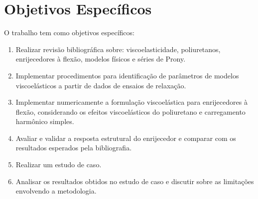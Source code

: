 \documentclass[arial,centeredequations,english,brazilian,oneside,section=TITLE]{ifes8}
\begin{document}
\section{Objetivos Específicos}
\label{sec:objetivos-especificos}

O trabalho tem como objetivos específicos:

\begin{enumerate}
  \item Realizar revisão bibliográfica sobre: viscoelasticidade, poliuretanos, 
enrijecedores à flexão, modelos físicos e séries de Prony.
  \item Implementar procedimentos para identificação de parâmetros de modelos 
viscoelásticos a partir de dados de ensaios de relaxação.
  \item Implementar numericamente a formulação viscoelástica para enrijecedores à flexão, 
  considerando os efeitos viscoelásticos do poliuretano e carregamento harmônico simples.
  \item Avaliar e validar a resposta estrutural do enrijecedor e comparar com os resultados 
  esperados pela bibliografia.
  \item Realizar um estudo de caso.
  \item Analisar os resultados obtidos no estudo de caso e discutir sobre as limitações 
  envolvendo a metodologia.

\end{enumerate}


\end{document}
